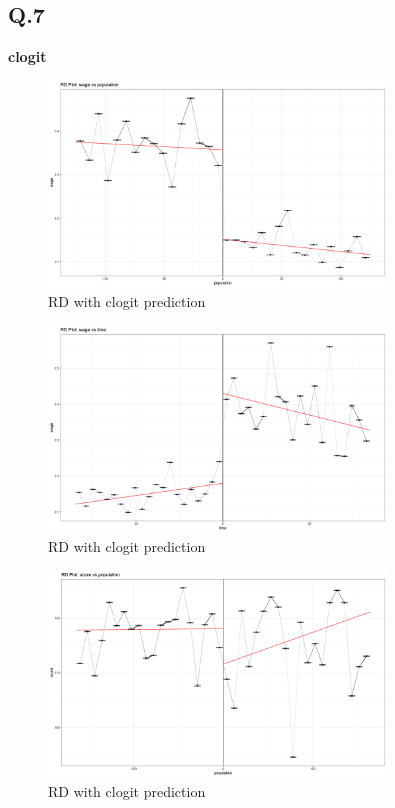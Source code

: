 \documentclass{article}
\begin{document}
\subsection*{Q.7}

\textbf{clogit}

\begin{figure}[H]
    \centering
    \includegraphics[width=0.8\textwidth]{figures/clogit_rd1.png}
    \caption{RD with clogit prediction}
    \label{fig:clogit_rd1}
\end{figure}

\begin{figure}[H]
    \centering
    \includegraphics[width=0.8\textwidth]{figures/clogit_rd2.png}
    \caption{RD with clogit prediction}
    \label{fig:clogit_rd2}
\end{figure}

\begin{figure}[H]
    \centering
    \includegraphics[width=0.8\textwidth]{figures/clogit_rd3.png}
    \caption{RD with clogit prediction}
    \label{fig:clogit_rd3}
\end{figure}
\end{document}
